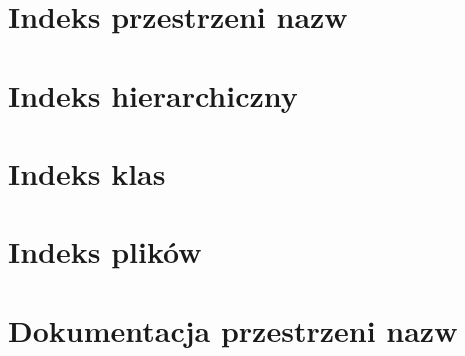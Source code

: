 \let\mypdfximage\pdfximage\def\pdfximage{\immediate\mypdfximage}\documentclass[twoside]{book}
\newcommand{\+}{\discretionary{\mbox{\scriptsize$\hookleftarrow$}}{}{}}
\begin{document}
\chapter{Indeks przestrzeni nazw}

\chapter{Indeks hierarchiczny}

\chapter{Indeks klas}

\chapter{Indeks plików}

\chapter{Dokumentacja przestrzeni nazw}










\end{document}

